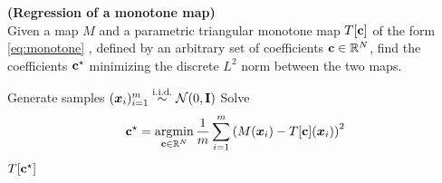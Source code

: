\documentclass[twoside,11pt]{article}
\def\argmin{\mathop{\mathrm{argmin}}}
\begin{document}
\begin{algorithm}[H]
  \caption{
    {\bf (Regression of a monotone map)} \\
    Given a map $M$ and a parametric triangular monotone map 
    $T[{\bf c}]$ of the form \eqref{eq:monotone} ,
    defined by an arbitrary set of coefficients
    ${\bf c}\in\mathbb{R}^N$, find
    the coefficients ${\bf c}^\star$ 
    minimizing the discrete $L^2$ norm between the two maps.
  }
  \label{alg:regresMap}
  \begin{algorithmic}[1]
    \State Generate samples 
    $({\bm x}_i)_{i=1}^m \overset{\text{i.i.d.}} \sim \mathcal{N}(0,{\bf I})$
    \State Solve
    \begin{equation*}
      \begin{aligned}
        {\bf c}^\star = \argmin_{{\bf c}\in\mathbb{R}^N} 
        \frac{1}{m} \sum_{i=1}^m 
        \left( M({\bm x}_i) - T[{\bf c}]({\bm x}_i) \right)^2
      \end{aligned}
    \end{equation*}
    \State \Return $T[{\bf c}^\star]$
    \EndProcedure
  \end{algorithmic}
\end{algorithm}

%
%
%
%
%
%
%
%
%
%
%
%
%
%
%
%
%
%
%
%
%
%
%
%
%
%
%
%
%
%
%
%
%
%
\end{document}

